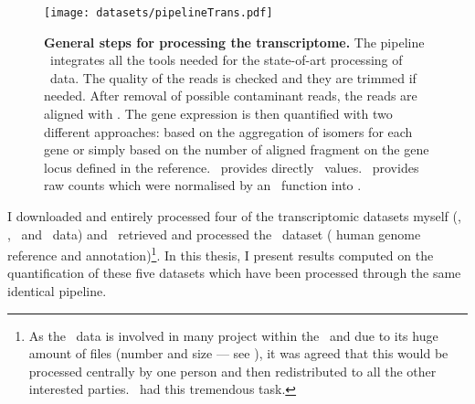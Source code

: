 \begin{figure}
    \texttt{[image: datasets/pipelineTrans.pdf]}\centering
    \caption[General steps for processing the transcriptomic
    data]{\label{fig:pipelineTrans}\textbf{General steps for processing the
    transcriptome.} The pipeline \irap\ integrates
    all the tools needed for the state-of-art
    processing of \Rnaseq\ data. The quality of the reads is checked and they
    are trimmed if needed. After removal of possible contaminant reads, the reads
    are aligned with \toph. The gene expression is then quantified with two
    different approaches: based on the aggregation of isomers for each gene or
    simply based on the number of aligned fragment on the gene locus defined in
    the reference. \cuffl\ provides directly \FPKM\ values. \htseq\ provides
    raw counts which were normalised by an \irap\ function into \FPKM.}
\end{figure}

I downloaded and entirely processed four of the transcriptomic datasets
myself (\castle, \vt, \ibm\ and \uhlen\ data) and
\nuno\ retrieved and processed the \gtex\ dataset (
human genome reference and  annotation)\footnote{As
the \Gtex\ data is involved in many project within the \EBI\
and due to its huge amount of files (number and  size --- see ),
it was agreed that this would be processed centrally by one person and then
redistributed to all the other interested parties. \nuno\ had this
tremendous task.}.
In this thesis,
I present results computed on the quantification of these
five datasets which have been processed through the same identical pipeline.



